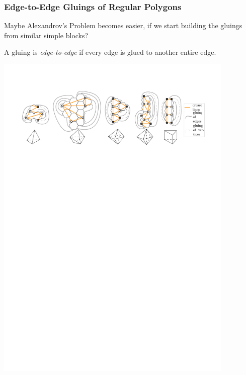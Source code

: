 
\begin{frame} \frametitle{Edge-to-Edge Gluings of Regular Polygons}
\vspace{0.12cm}

Maybe Alexandrov's Problem becomes easier, if we start building the gluings \\
from similar simple blocks? \bigskip

\begin{definition}
	A gluing is {\itshape edge-to-edge} if every edge is glued to another entire edge.
\end{definition} \medskip

\begin{center}
	\includegraphics[width=11.4cm]{figs_pres/hex_glued} \\
\end{center}
\end{frame}




